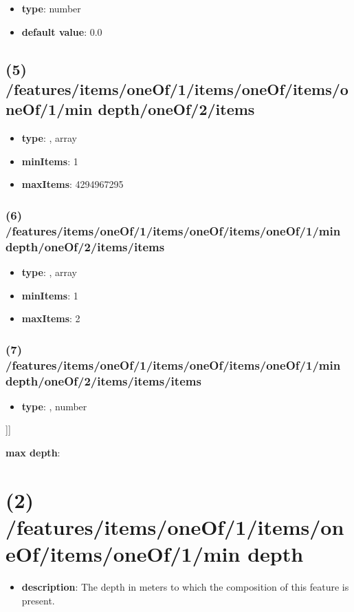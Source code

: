 \begin{itemize}[leftmargin=6em]\item {\bf type}: number\item {\bf default value}: 0.0
\end{itemize}\subsection{(5) /features/items/oneOf/1/items/oneOf/items/oneOf/1/min depth/oneOf/2/items}
\begin{itemize}[leftmargin=5em]\item {\bf type}: , array\item {\bf minItems}: 1
\item {\bf maxItems}: 4294967295
\end{itemize}\subsubsection{(6) /features/items/oneOf/1/items/oneOf/items/oneOf/1/min depth/oneOf/2/items/items}
\begin{itemize}[leftmargin=6em]\item {\bf type}: , array\item {\bf minItems}: 1
\item {\bf maxItems}: 2
\end{itemize}\subsubsection{(7) /features/items/oneOf/1/items/oneOf/items/oneOf/1/min depth/oneOf/2/items/items/items}
\begin{itemize}[leftmargin=7em]\item {\bf type}: , number\end{itemize}]]\item {\bf max depth}: \section{(2) /features/items/oneOf/1/items/oneOf/items/oneOf/1/min depth}
\begin{itemize}[leftmargin=2em]\item {\bf description}: The depth in meters to which the composition of this feature is present.
\end{itemize}
